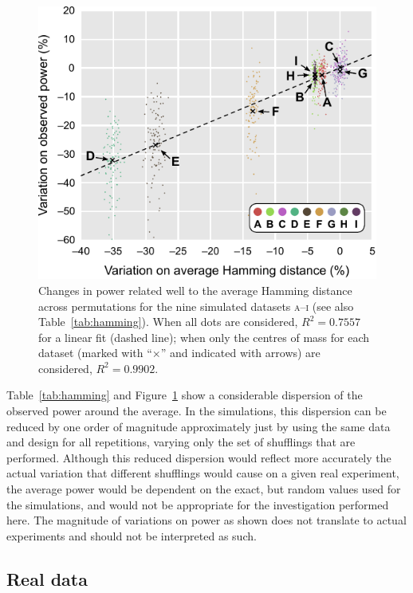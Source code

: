 \begin{figure}[tbp]
\centering
\includegraphics{figures/hamming.pdf}
\caption{Changes in power related well to the average Hamming distance across permutations for the nine simulated datasets \textsc{a}--\textsc{i} (see also Table~\ref{tab:hamming}). When all dots are considered, $R^2 = 0.7557$ for a linear fit (dashed line); when only the centres of mass for each dataset (marked with ``$\times$'' and indicated with arrows) are considered, $R^2 = 0.9902$.}
\label{fig:hamming}
\end{figure}

Table~\ref{tab:hamming} and Figure~\ref{fig:hamming} show a considerable dispersion of the observed power around the average. In the simulations, this dispersion can be reduced by one order of magnitude approximately just by using the same data and design for all repetitions, varying only the set of shufflings that are performed. Although this reduced dispersion would reflect more accurately the actual variation that different shufflings would cause on a given real experiment, the average power would be dependent on the exact, but random values used for the simulations, and would not be appropriate for the investigation performed here. The magnitude of variations on power as shown does not translate to actual experiments and should not be interpreted as such.

\subsection{Real data}

